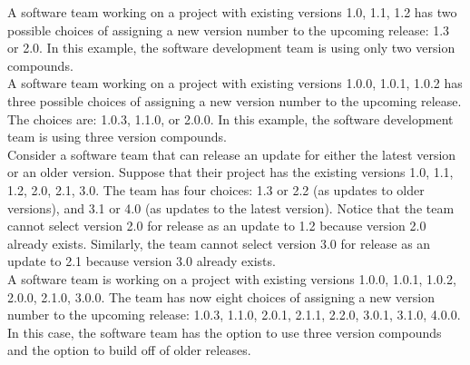 \documentclass[conference]{IEEEtran}
\begin{document}

 A software team working on a project with existing versions 1.0, 1.1, 1.2 has two possible choices of assigning a new version number to the upcoming release: 1.3 or 2.0. 
In this example, the software development team is using only two version compounds. \\

 A software team working on a project with existing versions 1.0.0, 1.0.1, 1.0.2 has three possible choices of assigning a new version number to the upcoming release. The choices are: 1.0.3, 1.1.0, or 2.0.0. 
In this example, the software development team is using three version compounds. \\


Consider a software team that can release an update for either the latest version or an older version. Suppose that their project has the existing versions 1.0, 1.1, 1.2, 2.0, 2.1, 3.0. The team has four choices: 1.3 or 2.2 (as updates to older versions), and 3.1 or 4.0 (as updates to the latest version). 
Notice that the team cannot select version 2.0 for release as an update to 1.2 
because version 2.0 already exists. 
Similarly, the team cannot select version 3.0 for release as an update to 2.1 because version 3.0 already exists. \\

  A software team  is working on a project with existing versions 1.0.0, 1.0.1, 1.0.2, 2.0.0, 2.1.0, 3.0.0. 
The team has now eight choices of assigning a new version number to the upcoming release: 
1.0.3, 1.1.0, 2.0.1, 2.1.1, 2.2.0, 3.0.1, 3.1.0, 4.0.0. 
In this case, the software team has the option to use three version compounds and the option to build off of older releases. \\



\end{document}
